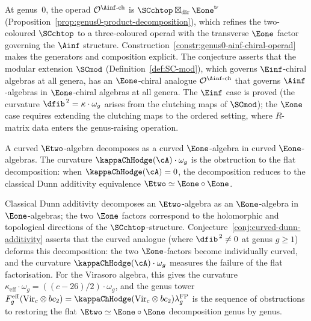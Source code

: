 \begin{remark}
\label{rem:modular-operad-ainf-context}
At genus~$0$, the operad $\mathcal{O}^{\Ainf\text{-ch}}$ is
$\SCchtop\boxtimes_{\mathrm{dir}}\Eone^{\mathsf{tr}}$
(Proposition~\ref{prop:genus0-product-decomposition}),
which refines the two-coloured $\SCchtop$ to a
three-coloured operad with the transverse $\Eone$ factor
governing the $\Ainf$ structure.
Construction~\ref{constr:genus0-ainf-chiral-operad} makes
the generators and composition explicit.
The conjecture asserts that
the modular extension $\SCmod$
(Definition~\ref{def:SC-mod}), which governs
$\Einf$-chiral algebras at all genera, has an $\Eone$-chiral
analogue $\mathcal{O}^{\Ainf\text{-ch}}$ that governs
$\Ainf$-algebras in $\Eone$-chiral algebras at all genera.
The $\Einf$ case is proved (the curvature
$\dfib^{\,2} = \kappa \cdot \omega_g$ arises from the
clutching maps of $\SCmod$); the $\Eone$ case requires
extending the clutching maps to the ordered setting, where
$R$-matrix data enters the genus-raising operation.
\end{remark}

\begin{conjecture}
\label{conj:curved-dunn-additivity}
A curved $\Etwo$-algebra decomposes as a curved $\Eone$-algebra
in curved $\Eone$-algebras. The curvature
$\kappaChHodge(\cA) \cdot \omega_g$ is the obstruction
to the flat decomposition: when $\kappaChHodge(\cA) = 0$,
the decomposition reduces to the classical Dunn additivity
equivalence $\Etwo \simeq \Eone \circ \Eone$.
\end{conjecture}

\begin{remark}
\label{rem:curved-dunn-genus-tower}
Classical Dunn additivity decomposes an $\Etwo$-algebra as an
$\Eone$-algebra in $\Eone$-algebras; the two $\Eone$ factors
correspond to the holomorphic and topological directions
of the $\SCchtop$-structure.
Conjecture~\ref{conj:curved-dunn-additivity} asserts that
the curved analogue (where $\dfib^{\,2} \ne 0$ at genus
$g \ge 1$) deforms this decomposition: the two
$\Eone$-factors become individually curved, and the curvature
$\kappaChHodge(\cA) \cdot \omega_g$ measures the
failure of the flat factorisation. For the Virasoro algebra,
this gives the curvature $\kappa_{\mathrm{eff}} \cdot \omega_g
= ((c-26)/2) \cdot \omega_g$, and the genus
tower $F_g^{\mathrm{eff}}(\mathrm{Vir}_c \otimes bc_2)
= \kappaChHodge(\mathrm{Vir}_c \otimes bc_2)
\lambda_g^{\mathrm{FP}}$
is the sequence of obstructions to restoring the flat
$\Etwo \simeq \Eone \circ \Eone$ decomposition genus by genus.
\end{remark}

